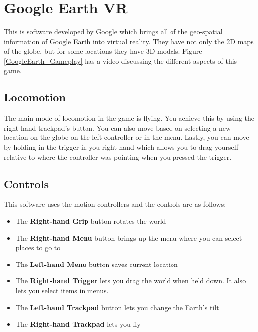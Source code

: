 \documentclass[journal]{IEEEtran}
\begin{document}
\section{Google Earth VR}

This is software developed by Google which brings all of the geo-spatial information of Google Earth into virtual reality. They have not only the 2D maps of the globe, but for some locations they have 3D models. Figure \ref{GoogleEarth_Gameplay} has a video discussing the different aspects of this game. 

\begin{figure}[h]
	\centering
\end{figure}

\subsection{Locomotion}
The main mode of locomotion in the game is flying. You achieve this by using the right-hand trackpad's button. You can also move based on selecting a new location on the globe on the left controller or in the menu. Lastly, you can move by holding in the trigger in you right-hand which allows you to drag yourself relative to where the controller was pointing when you pressed the trigger.
\subsection{Controls}
This software uses the motion controllers and the controls are as follows: 

\begin{itemize}
	\item The \textbf{Right-hand Grip} button  rotates the world
	\item The \textbf{Right-hand Menu} button brings up the menu where you can select places to go to
	\item The \textbf{Left-hand Menu} button saves current location
	\item The \textbf{Right-hand Trigger} lets you drag the world when held down. It also lets you select items in menus. 
	\item The \textbf{Left-hand Trackpad} button lets you change the Earth's tilt
	\item The \textbf{Right-hand Trackpad} lets you fly
\end{itemize}
\end{document}
